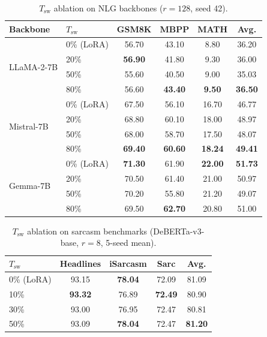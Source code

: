\documentclass{article}
\newcommand{\Tswitch}{T_{\mathrm{sw}}}
\begin{document}
\begin{table}[!ht]
\caption{$\Tswitch$ ablation on NLG backbones ($r=128$, seed 42).}
\label{tab:nlg_ablation}
\centering
\footnotesize
\renewcommand{\arraystretch}{1.1}
\setlength{\tabcolsep}{6pt}
\begin{tabular}{ll | ccc | c}
\toprule
\textbf{Backbone} & $\Tswitch$ & \textbf{GSM8K} & \textbf{MBPP} & \textbf{MATH} & \textbf{Avg.} \\
\midrule
\multirow{4}{*}{LLaMA-2-7B}
    & 0\% (LoRA) & 56.70 & 43.10 & 8.80 & 36.20 \\
    & 20\%       & \textbf{56.90} & 41.80 & 9.30 & 36.00 \\
    & 50\%       & 55.60 & 40.50 & 9.00 & 35.03 \\
    & 80\%       & 56.60 & \textbf{43.40} & \textbf{9.50} & \textbf{36.50} \\
\midrule
\multirow{4}{*}{Mistral-7B}
    & 0\% (LoRA) & 67.50 & 56.10 & 16.70 & 46.77 \\
    & 20\%       & 68.80 & 60.10 & 18.00 & 48.97 \\
    & 50\%       & 68.00 & 58.70 & 17.50 & 48.07 \\
    & 80\%       & \textbf{69.40} & \textbf{60.60} & \textbf{18.24} & \textbf{49.41} \\
\midrule
\multirow{4}{*}{Gemma-7B}
    & 0\% (LoRA) & \textbf{71.30} & 61.90 & \textbf{22.00} & \textbf{51.73} \\
    & 20\%       & 70.50 & 61.40 & 21.00 & 50.97 \\
    & 50\%       & 70.20 & 55.80 & 21.20 & 49.07 \\
    & 80\%       & 69.50 & \textbf{62.70} & 20.80 & 51.00 \\
\bottomrule
\end{tabular}
\end{table}

\begin{table}[!ht]
\caption{$\Tswitch$ ablation on sarcasm benchmarks (DeBERTa-v3-base, $r=8$, 5-seed mean).}
\label{tab:sarc_ablation}
\centering
\footnotesize
\setlength{\tabcolsep}{9pt}
\begin{tabular}{l | ccc | c}
\toprule
$\Tswitch$ & \textbf{Headlines} & \textbf{iSarcasm} & \textbf{Sarc} & \textbf{Avg.} \\
\midrule
0\% (LoRA) & 93.15 & \textbf{78.04} & 72.09 & 81.09 \\
10\%       & \textbf{93.32} & 76.89 & \textbf{72.49} & 80.90 \\
30\%       & 93.00 & 76.95 & 72.47 & 80.81 \\
50\%       & 93.09 & \textbf{78.04} & 72.47 & \textbf{81.20} \\
\bottomrule
\end{tabular}
\end{table}
\end{document}
